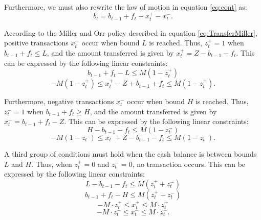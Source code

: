 Furthermore, we must also rewrite the law of motion in equation \eqref{eq:cont} as:
\begin{equation}
b_t = b_{t-1} + f_t + x_t^+ - x_t^-. 
\label{eq:cont2}
\end{equation}

According to the Miller and Orr policy described in equation \eqref{eq:TransferMiller}, positive transactions $x_t^+$ occur when bound $L$ is reached. Thus, $z_t^+=1$ when $b_{t-1}+f_t \leq L$, and the amount transferred is given by $x_t^+ = Z - b_{t-1} - f_t$. This can be expressed by the following linear constraints:
\begin{equation}
b_{t-1} + f_t - L \leq M (1 - z_t^+)
\end{equation}
\begin{equation}
-M (1 - z_t^+) \leq x_t^+ - Z + b_{t-1} + f_t\leq M (1 - z_t^+).
\end{equation}

Furthermore, negative transactions $x_t^-$ occur when bound $H$ is reached. Thus, $z_t^-=1$ when $b_{t-1} + f_t \geq H$, and the amount transferred is given by $x_t^- = b_{t-1} + f_t - Z$. This can be expressed by the following linear constraints:
\begin{equation}
H - b_{t-1} - f_t \leq M (1 - z_t^-)
\end{equation}
\begin{equation}
-M (1 - z_t^-) \leq x_t^- + Z - b_{t-1} - f_t \leq M (1 - z_t^-).
\end{equation}

A third group of conditions must hold when the cash balance is between bounds $L$ and $H$. Thus, when $z_t^+=0$ and $z_t^-=0$, no transaction occurs. This can be expressed by the following linear constraints:
\begin{equation}
L - b_{t-1} - f_t \leq M (z_t^+ + z_t^-)
\end{equation}
\begin{equation}
b_{t-1} + f_t - H \leq M (z_t^+ + z_t^-)
\end{equation}
\begin{equation}
-M \cdot z_t^+  \leq x_t^+ \leq M \cdot z_t^+ 
\end{equation}
\begin{equation}
-M \cdot z_t^- \leq x_t^- \leq M \cdot z_t^-. 
\end{equation}


